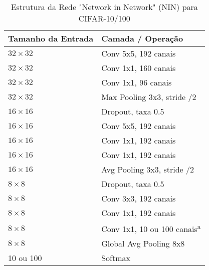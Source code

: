 \begin{table}[ht]
    \centering
    \begin{threeparttable}
        \caption{Estrutura da Rede "Network in Network" (NIN) para CIFAR-10/100}
        \label{tab:nin_arquitetura}
        \begin{tabular}{ll}
            \toprule
            \textbf{Tamanho da Entrada} & \textbf{Camada / Operação} \\
            \midrule
            
            $32 \times 32$ & Conv 5x5, 192 canais \\
            $32 \times 32$ & Conv 1x1, 160 canais \\
            $32 \times 32$ & Conv 1x1, 96 canais \\
            $32 \times 32$ & Max Pooling 3x3, stride /2 \\
            \addlinespace %
            
            $16 \times 16$ & Dropout, taxa 0.5 \\
            $16 \times 16$ & Conv 5x5, 192 canais \\
            $16 \times 16$ & Conv 1x1, 192 canais \\
            $16 \times 16$ & Conv 1x1, 192 canais \\
            $16 \times 16$ & Avg Pooling 3x3, stride /2 \\
            \addlinespace
            
            $8 \times 8$ & Dropout, taxa 0.5 \\
            $8 \times 8$ & Conv 3x3, 192 canais \\
            $8 \times 8$ & Conv 1x1, 192 canais \\
            $8 \times 8$ & Conv 1x1, 10 ou 100 canais\textsuperscript{a} \\
            $8 \times 8$ & Global Avg Pooling 8x8 \\
            \addlinespace
            
            10 ou 100 & Softmax \\
            
            \bottomrule
        \end{tabular}
        

\end{threeparttable}
\end{table}
